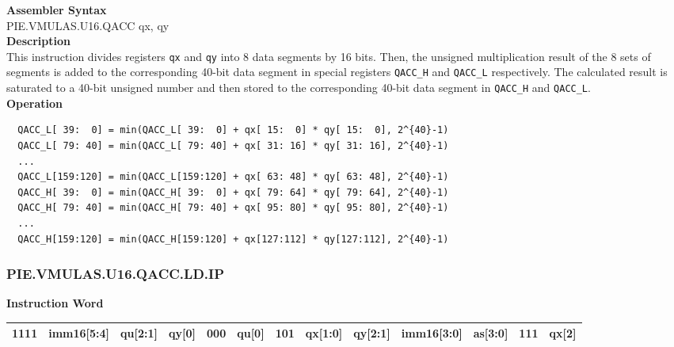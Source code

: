 \textbf{Assembler Syntax} \\
PIE.VMULAS.U16.QACC qx, qy \\
\textbf{Description} \\
This instruction divides registers \lstinline{qx} and \lstinline{qy} into 8 data segments by 16 bits. Then, the unsigned multiplication result of the 8 sets of segments is added to the corresponding 40-bit data segment in special registers \lstinline{QACC_H} and \lstinline{QACC_L} respectively. The calculated result is saturated to a 40-bit unsigned number and then stored to the corresponding 40-bit data segment in \lstinline{QACC_H} and \lstinline{QACC_L}.\\
\textbf{Operation}
\begin{lstlisting}
  QACC_L[ 39:  0] = min(QACC_L[ 39:  0] + qx[ 15:  0] * qy[ 15:  0], 2^{40}-1)
  QACC_L[ 79: 40] = min(QACC_L[ 79: 40] + qx[ 31: 16] * qy[ 31: 16], 2^{40}-1)
  ...
  QACC_L[159:120] = min(QACC_L[159:120] + qx[ 63: 48] * qy[ 63: 48], 2^{40}-1)
  QACC_H[ 39:  0] = min(QACC_H[ 39:  0] + qx[ 79: 64] * qy[ 79: 64], 2^{40}-1)
  QACC_H[ 79: 40] = min(QACC_H[ 79: 40] + qx[ 95: 80] * qy[ 95: 80], 2^{40}-1)
  ...
  QACC_H[159:120] = min(QACC_H[159:120] + qx[127:112] * qy[127:112], 2^{40}-1)
\end{lstlisting}

\newpage
\subsubsection{PIE.VMULAS.U16.QACC.LD.IP}\label{instruction:PIEVMULASU16QACCLDIP}
\setlength\tabcolsep{6pt}
\textbf{Instruction Word} \\
\begin{tabular}{|c|c|c|c|c|c|c|c|c|c|c|c|c|}
	\hline
	1111 & imm16[5:4] & qu[2:1] & qy[0] & 000 & qu[0] & 101 & qx[1:0] & qy[2:1] & imm16[3:0] & as[3:0] & 111 & qx[2] \\
	\hline
\end{tabular}

